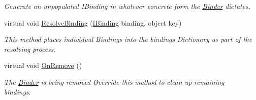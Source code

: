 \begin{DoxyCompactItemize}
\begin{DoxyCompactList}\small\item\em Generate an unpopulated I\-Binding in whatever concrete form the \hyperlink{classstrange_1_1framework_1_1impl_1_1_binder}{Binder} dictates. \end{DoxyCompactList}\item 
virtual void \hyperlink{classstrange_1_1framework_1_1impl_1_1_binder_a59b9ca38325bf6cf4c55aa309e92d00c}{Resolve\-Binding} (\hyperlink{interfacestrange_1_1framework_1_1api_1_1_i_binding}{I\-Binding} binding, object key)
\begin{DoxyCompactList}\small\item\em This method places individual Bindings into the bindings Dictionary as part of the resolving process. \end{DoxyCompactList}\item 
\hypertarget{classstrange_1_1framework_1_1impl_1_1_binder_ae43511788f7ce5bc0c840816c935036d}{virtual void \hyperlink{classstrange_1_1framework_1_1impl_1_1_binder_ae43511788f7ce5bc0c840816c935036d}{On\-Remove} ()}\label{classstrange_1_1framework_1_1impl_1_1_binder_ae43511788f7ce5bc0c840816c935036d}

\begin{DoxyCompactList}\small\item\em The \hyperlink{classstrange_1_1framework_1_1impl_1_1_binder}{Binder} is being removed Override this method to clean up remaining bindings. \end{DoxyCompactList}\end{DoxyCompactItemize}
